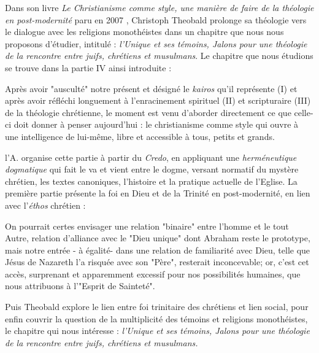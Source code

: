 Dans son livre \textit{Le Christianisme comme style, une manière de faire de la théologie en post-modernité} paru en 2007 \cite{theobald_christianisme_2007}, Christoph Theobald prolonge sa théologie vers le dialogue avec les religions monothéistes dans un chapitre que nous nous proposons d'étudier, intitulé : \textit{l'Unique et ses témoins, Jalons pour une théologie de la rencontre entre juifs, chrétiens et musulmans}.  
 Le chapitre que nous étudions se trouve dans la partie IV ainsi introduite : 

 \begin{singlequote}
     Après avoir "ausculté" notre présent et désigné le \textit{kairos} qu'il représente (I) et après avoir réfléchi longuement à l'enracinement spirituel (II) et scripturaire (III) de la théologie chrétienne, le moment est venu d'aborder directement ce que celle-ci doit donner à penser aujourd'hui : le christianisme comme style qui ouvre à une intelligence de lui-même, libre et accessible à tous, petits et grands. 
     \cite[p 699]{theobald_christianisme_2007}
 \end{singlequote}
 
l'A. organise cette partie à partir du \textit{Credo}, en appliquant une \textit{herméneutique dogmatique} \cite[p. 700]{theobald_christianisme_2007}  qui fait le va et vient entre le dogme, versant normatif du mystère chrétien, les textes canoniques, l'histoire et la pratique actuelle de l'Eglise. La première partie présente la foi en Dieu et de la Trinité en post-modernité, en lien avec l'\textit{éthos} chrétien  : 
 

\begin{singlequote}
    On pourrait certes envisager une relation "binaire" entre l'homme et le tout Autre, relation d'alliance avec le "Dieu unique" dont Abraham reste le prototype, mais notre entrée - à égalité\;- dans une relation de familiarité avec Dieu, telle que Jésus de Nazareth l'a risquée avec son "Père", resterait inconcevable; or, c'est cet accès, surprenant et apparemment excessif pour nos possibilités humaines, que nous attribuons à l'"Esprit de Sainteté". \cite[p. 705]{theobald_christianisme_2007}
 \end{singlequote}
 
 Puis Theobald explore le lien entre foi trinitaire des chrétiens et lien social, pour enfin couvrir la question de la multiplicité des témoins et religions monothéistes, le chapitre qui nous intéresse : \textit{ l'Unique et ses témoins, Jalons pour une théologie de la rencontre entre juifs, chrétiens et musulmans.}

